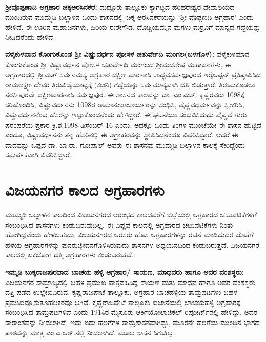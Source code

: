 \textbf{ಶ‍್ರೀವೊಪ್ಪಣಾದಿ ಅಗ್ರಹಾರ ಚಿಕ್ಕಅರಸಿನಕೆರೆ:} ಮದ್ದೂರು ತಾಲ್ಲೂಕು ಕ್ಯಾಗಟ್ಟದ ಹರಿಹರೇಶ್ವರ ದೇವಾಲಯದ ಮುಂದಿರುವ ಮುಮ್ಮಡಿ ಬಲ್ಲಾಳನ ಒಂದು ಶಾಸನದಲ್ಲಿ ಚಿಕ್ಕ ಅರಸಿನಕೆರೆಯನ್ನು `ಶ‍್ರೀ ವೊಪ್ಪಣದಿ ಅಗ್ರಹಾರ' ಎಂದು ಹೇಳಿದೆ. ಈ ಊರಿನ ಮಹಾಜನಗಳು, ಹಿರಿಯ ಈರೇಗೌಡ, ದೊಡ್ಡಿಯಮ್ಮನ ಮಗಳು ಮರ್ರವಿಗೆ ಮಾನ್ಯದ ಗದ್ದೆಯನ್ನು ನೀಡಿದರೆಂದು ಹೇಳಿದೆ.

\textbf{ವಳೈಕುಳವಾದ ಕೊಂಗುಕೊಂಡ ಶ‍್ರೀ ವಿಷ್ಣುವರ್ಧನ ಪೋಸಳ ಚತುರ್ವೇದಿ ಮಂಗಲ(ಬಳಗೊಳ):} ವಳೈಕುಳಮಾನ ಕೊಂಗುಕೊಂಡ ಶ‍್ರೀ ವಿಷ್ಣುವರ್ಧನ ಪೋಸಳ ಚತುರ್ವೇದಿ ಮಂಗಲದ ಶ‍್ರೀಮದಶೇಷ ಮಹಾಜನಗಳು, ಈ ಅಗ್ರಹಾರದಲ್ಲಿ ಶ‍್ರೀಮತ್​ ಸರ್ವನಮಸ್ಯ ಅಗ್ರಹಾರ ದಕ್ಷಿಣ ವಾರಣಾಸಿ ಉದ್ಭವಸರ್ವಜ್ಞಪುರದ ಇರೈಅಪ್ಪನ್​ ಪ್ರತಿಷ್ಠಾಪಿಸಿದ ರಾಮಲಕ್ಷ್ಮಣ ದೇವರ ತಿರುವಿಡೈಯಾಟ್ಟಕ್ಕೆ (ಕೞನಿ) ಗದ್ದೆಯನ್ನು ಸರ್ವಮಾನ್ಯವಾಗಿ ದತ್ತಿ ಬಿಡುತ್ತಾರೆ. ತಿರುಮಕೂಡಲು ನರಸೀಪುರವೇ ದಕ್ಷಿಣವಾರಣಾಸಿ ಸರ್ವಜ್ಞಪುರ. ಈ ಶಾಸನದ ಕಾಲವನ್ನು ಡಾ. ಎಂ.ಎಚ್​. ಕೃಷ್ಣರವರು 1098ಕ್ಕೆ ಸರಿಹೊಂದಿಸಿ, ವಿಷ್ಣುವರ್ಧನನು 1098ರ ರಾಮಾನುಜಾಚಾರ್ಯರನ್ನು ಸಂಧಿಸಿ, ವೈಷ್ಣವಧರ್ಮವನ್ನು ಸ್ವೀಕರಿಸಿ, ವಿಷ್ಣುವರ್ಧನನೆಂಬ ಹೆಸರನ್ನು ಇಟ್ಟುಕೊಂಡನೆಂದು ಹೇಳಿದ್ದಾರೆ. ಈ ಘಟನೆಯು ಸಂಭವಿಸಿದುದು ವೈಷ್ಣವ ಗುರು ಪರಂಪರೆಯ ಪ್ರಕಾರ ಕ್ರಿ.ಶ.1098 ಡಿಸೆಂಬರ್​ 16 ಎಂದು, ಅದಕ್ಕೂ ಒಂದು ತಿಂಗಳ ಮುಂಚೆಯೇ ಈ ಶಾಸನ ಹುಟ್ಟಿದೆ ಎಂದೂ, ವಿಷ್ಣುವರ್ಧನನು ತನ್ನ ಹೆಸರಿನಲ್ಲಿ ಈ ಅಗ್ರಾಹರವನ್ನು ಸ್ಥಾಪಿಸಿದನೆಂದೂ ವಿವರಿಸಿದ್ದಾರೆ. ಆದರೆ ಈ ವಾದವನ್ನು ಒಪ್ಪದ ಡಾ. ಬಾ.ರಾ. ಗೋಪಾಲ್​ ಅವರು ಈ ಶಾಸನವು ಮುಮ್ಮಡಿ ಬಲ್ಲಾಳನ ಕಾಲಕ್ಕೆ ಸೇರಿದ್ದೆಂದು ಸಮರ್ಪಕವಾಗಿ ವಿವರಿಸಿದ್ದಾರೆ.

\vskip -4pt

\section*{ವಿಜಯನಗರ ಕಾಲದ ಅಗ್ರಹಾರಗಳು}

\vskip -2pt

ಮುಮ್ಮಡಿ ಬಲ್ಲಾಳನ ಕಾಲದಿಂದ ವಿಜಯನಗರದ ಆರಂಭದ ಕಾಲದವರೆಗೆ ಜಿಲ್ಲೆಯಲ್ಲಿ ಅಗ್ರಹಾರದ ಚಟುವಟಿಕೆಗಳಿಗೆ ಸಂಬಂಧಿಸಿದ ಶಾಸನಗಳು ಕಂಡುಬರುವುದಿಲ್ಲ. ಈ ವಿಪ್ಲವ ಕಾಲದಲ್ಲಿ ಅಗ್ರಹಾರದ ಚಟುವಟಿಕೆಗಳು ನಿಂತು ಹೋಗಿದ್ದವೆಂದು ಹೇಳಬಹುದು. ವಿಜಯನಗರದ ಅರಸರು ಹೊಸ ಅಗ್ರಹಾರಗಳನ್ನು ರಚನೆ ಮಾಡಿದುದರ ಜೊತೆಗೆ ಹಳೆಯ ಅಗ್ರಹಾರಗಳನ್ನು ಪುನರುಜ್ಜೀವನಗೊಳಿಸಿರುವುದು ಶಾಸನಗಳ ಅಧ್ಯಯನದಿಂದ ಕಂಡುಬರುತ್ತದೆ. ವಿಜಯನಗರ ಕಾಲದಲ್ಲಿ ಏಕಭೋಗ ದತ್ತಿ ಅಗ್ರಹಾರಗಳು ಕಂಡುಬರುತ್ತವೆ.

\vskip -2pt

\textbf{ಇಮ್ಮಡಿ ಬುಕ್ಕರಾಜಪುರವಾದ ಬಾಚೆಯ ಹಳ್ಳಿ ಅಗ್ರಹಾರ/ ಸಾಯಣ, ಮಾಧವರು ಹಾಗೂ ಅವರ ವಂಶಸ್ಥರು:} ವಿಜಯನಗರ ಸಾಮ್ರಾಜ್ಯದಲ್ಲಿ ಬಹಳ ಪ್ರಮುಖ ಪಾತ್ರವಹಿಸಿದ್ದ ಸಾಯಣ ಮತ್ತು ಮಾಧವ ಹಾಗೂ ಅವರ ವಂಶಸ್ಥರು ದತ್ತಿ ಪಡೆದ ಉಲ್ಲೇಖವಿರುವ, ಕೃಷ್ಣರಾಜಪೇಟೆ ತಾಲ್ಲೂಕು, ಅಗ್ರಹಾರ ಬಾಚಹಳ್ಳಿಯ ತಾಮ್ರಪಟಗಳು ಬಹಳ ಪ್ರಮುಖವೂ,\break ಕುತೂಹಲಕರವೂ ಆಗಿವೆ. ಕೃಷ್ಣರಾಜಪೇಟೆ ತಾಲ್ಲೂಕು ಖಜಾನೆಯಲ್ಲಿ ಬಾಚೆಯಹಳ್ಳಿ ಅಗ್ರಹಾರಕ್ಕೆ ಸಂಬಂಧಿಸಿದ ತಾಮ್ರಪಟಗಳಿವೆ ಎಂದು 1914ರ ಮೈಸೂರು ಆರ್ಕಿಯೋಲಾಜಿಕಲ್​ ರಿಪೋರ್ಟ್‌ನಲ್ಲಿ ಹೇಳಿದ್ದು, ಅದರ ಸಾರಾಂಶವನ್ನು ನೀಡಲಾಗಿದೆ. ಇದು ಐದು ಹಲಗೆಗಳ ತಾಮ್ರಶಾಸನವಾಗಿದ್ದು, ಮೂರನೇ ಹಲಗೆಯ ಮುಂದಿನ ಭಾಗದ ಪಾಠವನ್ನು ಮಾತ್ರ ಎಂ.ಎ.ಆರ್​.ನಲ್ಲಿ ನೀಡಲಾಗಿದೆ. ಮೂಲ ಶಾಸನ ಸಿಗುತ್ತಿಲ್ಲ.


